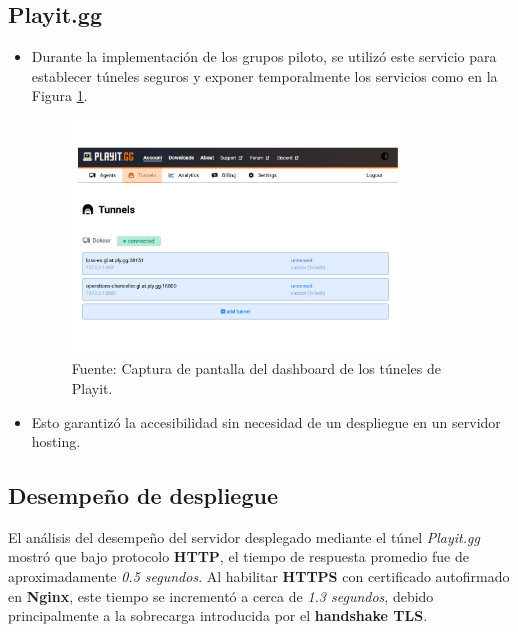 \documentclass[letter,oneside,12pt,spanish]{report}
\begin{document}
\subsection{Playit.gg}
\begin{itemize}
    \item Durante la implementación de los grupos piloto, se utilizó este servicio para establecer túneles seguros y exponer temporalmente los servicios como en la Figura \ref{fig:Playit}.
    
	\begin{figure}[ht]
		\centering
		\includegraphics[width=0.83\textwidth]{Figs/dashboard playit.gg.pdf}
		\label{fig:Playit}
		\\Fuente: Captura de pantalla del dashboard de los túneles de Playit.
	\end{figure}
	
	\item Esto garantizó la accesibilidad sin necesidad de un despliegue en un servidor hosting.
\end{itemize}

\subsection{Desempeño de despliegue}

El análisis del desempeño del servidor desplegado mediante el túnel \textit{Playit.gg} mostró que bajo protocolo \textbf{HTTP}, el tiempo de respuesta promedio fue de aproximadamente \textit{0.5 segundos}. Al habilitar \textbf{HTTPS} con certificado autofirmado en \textbf{Nginx}, este tiempo se incrementó a cerca de \textit{1.3 segundos}, debido principalmente a la sobrecarga introducida por el \textbf{handshake TLS}.
\end{document}
